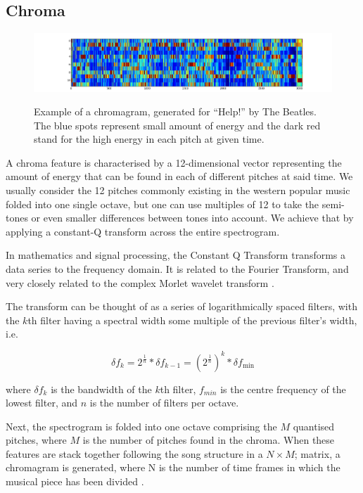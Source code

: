 \subsection{Chroma}

\begin{figure}       
      \centering
                \includegraphics[width=\textwidth]{Figures/chromagram_example}
			   \vspace{20pt}
			   \label{fig:chromaexample}
			   \caption{Example of a chromagram, generated for ``Help!'' by The Beatles. The blue spots represent small amount of energy and the dark red stand for the high energy in each pitch at given time.}
\end{figure}

A chroma feature is characterised by a 12-dimensional vector representing the amount of energy that can be found in each of different pitches at said time. We usually consider the 12 pitches commonly existing in the western popular music folded into one single octave, but one can use multiples of 12 to take the semi-tones or even smaller differences between tones into account. We achieve that by applying a constant-Q transform across the entire spectrogram. 

In mathematics and signal processing, the Constant Q Transform transforms a data series to the frequency domain. It is related to the Fourier Transform, and very closely related to the complex Morlet wavelet transform \cite{wavelet}. 

The transform can be thought of as a series of logarithmically spaced filters, with the $k$th filter having a spectral width some multiple of the previous filter's width, i.e.

\begin{equation}
\delta f_k = 2^{ \frac {1}{n} } * \delta f_{k-1} = \left ( {2^{ \frac {1}{n} }} \right )^{k} * \delta f_{\mathrm{min}}
\end{equation}

where $\delta f_{k}$ is the bandwidth of the $k$th filter, $f_{min}$ is the centre frequency of the lowest filter, and $n$ is the number of filters per octave.

Next, the spectrogram is folded into one octave comprising the $M$ quantised pitches, where $M$ is the number of pitches found in the chroma. When these features are stack together following the song structure in a $N \times M$; matrix, a chromagram is generated, where N is the number of time frames in which the musical piece has been divided \cite{constantQ}.

